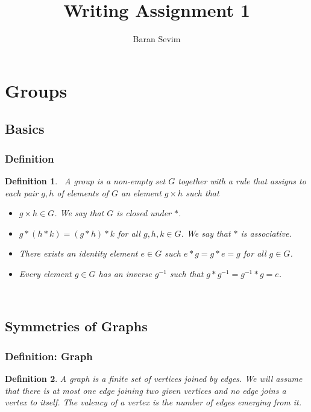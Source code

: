 \documentclass{article}
\title{Writing Assignment 1}
\author{Baran Sevim}
\date{ }
\theoremstyle{plain}
\newtheorem{definition}{Definition}
\begin{document}
\maketitle

\section{Groups}
\subsection{Basics}
\subsubsection{Definition}
\begin{definition}
\
    A \textit{group} is a non-empty set \(G\) together with a rule that assigns to each pair \(g, h\) of elements of \(G\) an element \(g \times h\) such that 
    \begin{itemize}
        \item \(g \times h \in G\). We say that \(G\) is \textit{closed} under \(*\).
    \end{itemize}
    \begin{itemize}
        \item \(g \ast (h \ast k) = (g \ast h) \ast k\) for all \(g, h, k \in G\). We say that \(*\) is associative.
    \end{itemize}
    \begin{itemize}
        \item There exists an \textit{identity element} \(e \in G\) such \(e * g = g * e = g\) for all \(g \in G\).
    \end{itemize}
    \begin{itemize}
        \item Every element \(g \in G\) has an inverse \(g^{-1}\) such that \(g * g^{-1} = g^{-1} * g = e\).
    \end{itemize}
    
\

\end{definition}

\subsection{Symmetries of Graphs}
\subsubsection{Definition: Graph}
\begin{definition}
    A \textit{graph} is a finite set of vertices joined by edges. We will assume that there is at most one edge joining two given vertices and no edge joins a vertex to itself. The \textit{valency} of a vertex is the number of edges emerging from it.
  \end{definition}
\end{document}
